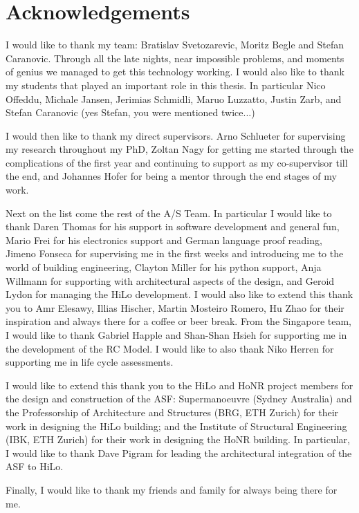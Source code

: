
\bigskip

\begingroup
\let\clearpage\relax
\let\cleardoublepage\relax
\let\cleardoublepage\relax
\chapter*{Acknowledgements}

\def\thanks#1{%
\begingroup
\leftskip1em
\noindent #1
\par
\endgroup
}

I would like to thank my team: Bratislav Svetozarevic, Moritz Begle and Stefan Caranovic. Through all the late nights, near impossible problems, and moments of genius we managed to get this technology working. I would also like to thank my students that played an important role in this thesis. In particular Nico Offeddu, Michale Jansen, Jerimias Schmidli, Maruo Luzzatto, Justin Zarb, and Stefan Caranovic (yes Stefan, you were mentioned twice...)

I would then like to thank my direct supervisors. Arno Schlueter for supervising my research throughout my PhD, Zoltan Nagy for getting me started through the complications of the first year and continuing to support as my co-supervisor till the end, and Johannes Hofer for being a mentor through the end stages of my work. 

Next on the list come the rest of the A/S Team. In particular I would like to thank Daren Thomas for his support in software development and general fun, Mario Frei for his electronics support and German language proof reading, Jimeno Fonseca for supervising me in the first weeks and introducing me to the world of building engineering, Clayton Miller for his python support, Anja Willmann for supporting with architectural aspects of the design, and Geroid Lydon for managing the HiLo development. I would also like to extend this thank you to Amr Elesawy, Illias Hischer, Martin Mosteiro Romero, Hu Zhao for their inspiration and always there for a coffee or beer break. From the Singapore team, I would like to thank Gabriel Happle and Shan-Shan Hsieh for supporting me in the development of the RC Model. I would like to also thank Niko Herren for supporting me in life cycle assessments. 

I would like to extend this thank you to the HiLo and HoNR project members for the design and construction of the ASF: Supermanoeuvre (Sydney Australia) and the Professorship of Architecture and Structures (BRG, ETH Zurich) for their work in designing the HiLo building; and the Institute of Structural Engineering (IBK, ETH Zurich) for their work in designing the HoNR building. In particular, I would like to thank Dave Pigram for leading the architectural integration of the ASF to HiLo.

Finally, I would like to thank my friends and family for always being there for me.



\endgroup
